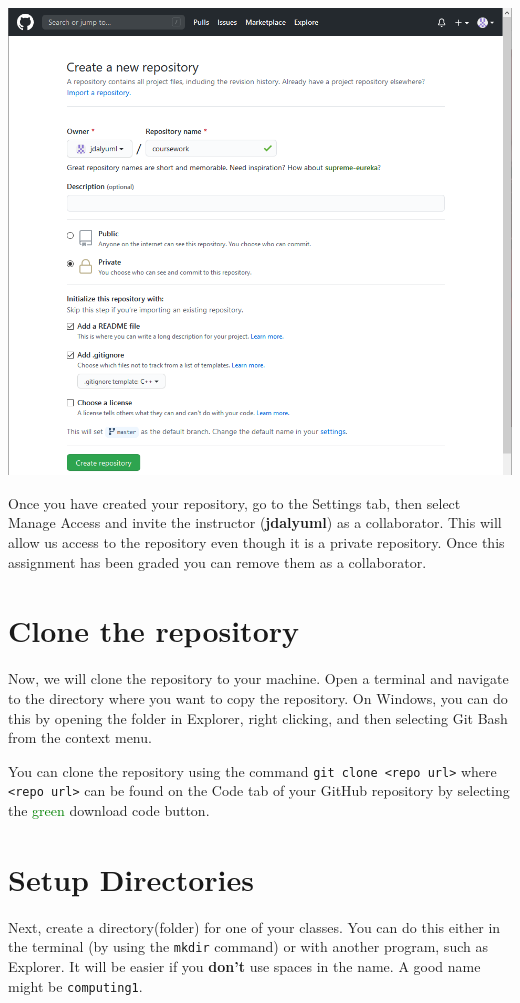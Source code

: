 \documentclass[12pt]{article}
\newcommand{\instructor}{jdalyuml}
\newcommand{\code}[1]{\texttt{#1}}
\begin{document}
\includegraphics[width=0.7\columnwidth]{newrepo}

Once you have created your repository, go to the Settings tab, then select Manage Access and invite the instructor (\textbf{\instructor}) as a collaborator.
This will allow us access to the repository even though it is a private repository.
Once this assignment has been graded you can remove them as a collaborator.


\section{Clone the repository}

Now, we will clone the repository to your machine.
Open a terminal and navigate to the directory where you want to copy the repository.
On Windows, you can do this by opening the folder in Explorer, right clicking, and then selecting Git Bash from the context menu.

You can clone the repository using the command \code{git clone <repo url>} where \code{<repo url>} can be found on the Code tab of your GitHub repository by selecting the \textcolor{green}{green} download code button.

\section{Setup Directories}

Next, create a directory(folder) for one of your classes.
You can do this either in the terminal (by using the \texttt{mkdir} command) or with another program, such as Explorer.
It will be easier if you \textbf{don't} use spaces in the name.
A good name might be \texttt{computing1}.
\end{document}
